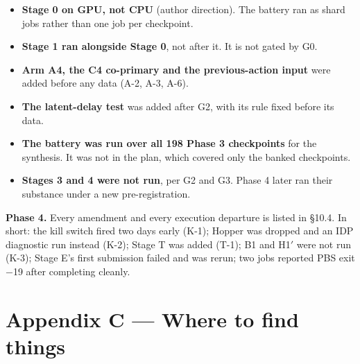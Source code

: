 \documentclass[11pt]{article}
\begin{document}
\begin{itemize}
\item \textbf{Stage 0 on GPU, not CPU} (author direction). The battery ran as shard jobs rather than one job per checkpoint.
\item \textbf{Stage 1 ran alongside Stage 0}, not after it. It is not gated by G0.
\item \textbf{Arm A4, the C4 co-primary and the previous-action input} were added before any data (A-2, A-3, A-6).
\item \textbf{The latent-delay test} was added after G2, with its rule fixed before its data.
\item \textbf{The battery was run over all 198 Phase 3 checkpoints} for the synthesis. It was not in the plan, which covered only the banked checkpoints.
\item \textbf{Stages 3 and 4 were not run}, per G2 and G3. Phase 4 later ran their substance under a new pre-registration.
\end{itemize}



\textbf{Phase 4.} Every amendment and every execution departure is listed in \S{}10.4. In short: the kill switch fired two days early (K-1); Hopper was dropped and an IDP diagnostic run instead (K-2); Stage T was added (T-1); B1 and H1$'$ were not run (K-3); Stage E's first submission failed and was rerun; two jobs reported PBS exit $-$19 after completing cleanly.



\section*{Appendix C --- Where to find things}
\end{document}
